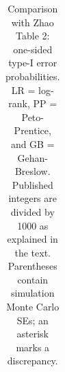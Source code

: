\documentclass[
  12pt]{article}
\begin{document}
{

\begin{longtable}[]{@{}
  >{\raggedright\arraybackslash}p{}
  >{\raggedright\arraybackslash}p{}
  >{\raggedleft\arraybackslash}p{}
  >{\raggedleft\arraybackslash}p{}
  >{\raggedleft\arraybackslash}p{}
  >{\raggedleft\arraybackslash}p{}
  >{\raggedleft\arraybackslash}p{}
  >{\raggedleft\arraybackslash}p{}@{}}

\caption{\label{tbl-zhao-type1}Comparison with Zhao Table 2: one-sided
type-I error probabilities. LR = log-rank, PP = Peto-Prentice, and GB =
Gehan-Breslow. Published integers are divided by 1000 as explained in
the text. Parentheses contain simulation Monte Carlo SEs; an asterisk
marks a discrepancy.}

\tabularnewline


\end{longtable}}
\end{document}
